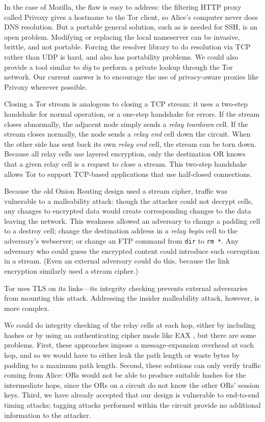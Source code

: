 \documentclass[times,10pt,twocolumn]{article}
\begin{document}
In the case of Mozilla, the flaw is easy to address: the filtering HTTP
proxy called Privoxy gives a hostname to the Tor client, so Alice's
computer never does DNS resolution.
But a portable general solution, such as is needed for
SSH, is
an open problem. Modifying or replacing the local nameserver
can be invasive, brittle, and not portable. Forcing the resolver
library to do resolution via TCP rather than UDP is
hard, and also has portability problems. We could also provide a
tool similar to \emph{dig} to perform a private lookup through the
Tor network. Our current answer is to encourage the use of
privacy-aware proxies like Privoxy wherever possible.

Closing a Tor stream is analogous to closing a TCP stream: it uses a
two-step handshake for normal operation, or a one-step handshake for
errors. If the stream closes abnormally, the adjacent node simply sends a
\emph{relay teardown} cell. If the stream closes normally, the node sends
a \emph{relay end} cell down the circuit. When the other side has sent
back its own \emph{relay end} cell, the stream can be torn down.  Because
all relay cells use layered encryption, only the destination OR knows
that a given relay cell is a request to close a stream.  This two-step
handshake allows Tor to support TCP-based applications that use half-closed
connections.

\label{subsec:integrity-checking}

Because the old Onion Routing design used a stream cipher, traffic was
vulnerable to a malleability attack: though the attacker could not
decrypt cells, any changes to encrypted data
would create corresponding changes to the data leaving the network.
This weakness allowed an adversary to change a padding cell to a destroy
cell; change the destination address in a \emph{relay begin} cell to the
adversary's webserver; or change an FTP command from
{\tt dir} to {\tt rm~*}. Any adversary who could guess the encrypted
content could introduce such corruption in a stream. (Even an external
adversary could do this, because the link encryption similarly used a
stream cipher.)

Tor uses TLS on its links---its integrity checking
prevents external adversaries from mounting this attack.
Addressing the insider malleability attack, however, is
more complex.

We could do integrity checking of the relay cells at each hop, either
by including hashes or by using an authenticating cipher mode like
EAX \cite{eax}, but there are some problems. First, these approaches
impose a message-expansion overhead at each hop, and so we would have to
either leak the path length or waste bytes by padding to a maximum
path length. Second, these solutions can only verify traffic coming
from Alice: ORs would not be able to produce suitable hashes for
the intermediate hops, since the ORs on a circuit do not know the
other ORs' session keys. Third, we have already accepted that our design
is vulnerable to end-to-end timing attacks; tagging attacks performed
within the circuit provide no additional information to the attacker.
\end{document}
